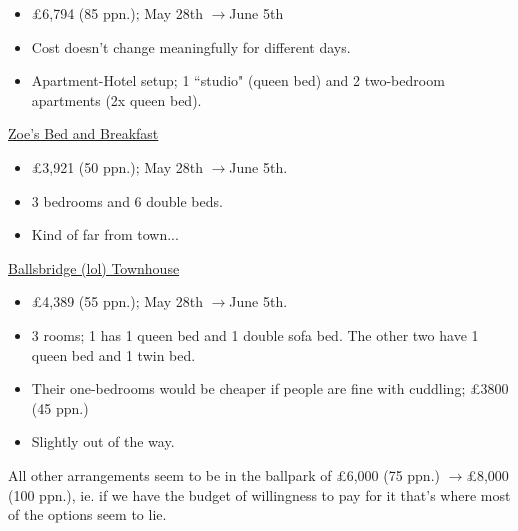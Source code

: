 \documentclass[12pt]{article}
\renewcommand{\to}{$\rightarrow$}
\newcommand{\cost}[2]{\pounds#1 (#2 ppn.)}
\begin{document}
	\begin{itemize}
		\item \cost{6,794}{85}; May 28th \to June 5th 
		\item Cost doesn't change meaningfully for different days.
		\item Apartment-Hotel setup; 1 ``studio" (queen bed) and 2 two-bedroom apartments (2x queen bed).
	\end{itemize}
	\href{https://www.airbnb.co.uk/rooms/7305892?adults=10&children=0&infants=0&check_in=2022-05-28&check_out=2022-06-05&federated_search_id=7416d1fc-62a0-4764-a1fa-8f70ded658be&source_impression_id=p3_1648312760_KodxjaW24K6A1UKj}{Zoe's Bed and Breakfast}
	\begin{itemize}
		\item \cost{3,921}{50}; May 28th \to June 5th.
		\item 3 bedrooms and 6 double beds.
		\item Kind of far from town...
	\end{itemize}
	\href{https://www.booking.com/hotel/ie/merrion-road-ballsbridge.html?aid=355028;sid=3f62ec944d118827daff72c411262409;all_sr_blocks=188261006_92403605_0_0_0%2C188261002_348859887_0_0_0%2C188261002_348859887_0_0_0;checkin=2022-05-28;checkout=2022-06-05;dest_id=-1502554;dest_type=city;dist=0;group_adults=10;group_children=0;hapos=4;highlighted_blocks=188261006_92403605_0_0_0%2C188261002_348859887_0_0_0%2C188261002_348859887_0_0_0;hpos=4;matching_block_id=188261006_92403605_0_0_0;no_rooms=1;req_adults=10;req_children=0;room1=A%2CA%2CA%2CA%2CA%2CA%2CA%2CA%2CA%2CA;sb_price_type=total;sr_order=popularity;sr_pri_blocks=188261006_92403605_0_0_0__204900%2C188261002_348859887_0_0_0__161117%2C188261002_348859887_0_0_0__161117;srepoch=1648312598;srpvid=4f9e74ca2749018e;type=total;ucfs=1&#hotelTmpl}{Ballsbridge (lol) Townhouse}
	\begin{itemize}
		\item \cost{4,389}{55}; May 28th \to June 5th.
		\item 3 rooms; 1 has 1 queen bed and 1 double sofa bed. The other two have 1 queen bed and 1 twin bed.
		\item Their one-bedrooms would be cheaper if people are fine with cuddling; \cost{3800}{45}
		\item Slightly out of the way.
	\end{itemize}
	All other arrangements seem to be in the ballpark of \cost{6,000}{75} \to \cost{8,000}{100}, ie. if we have the budget of willingness to pay for it that's where most of the options seem to lie.
\end{document}
